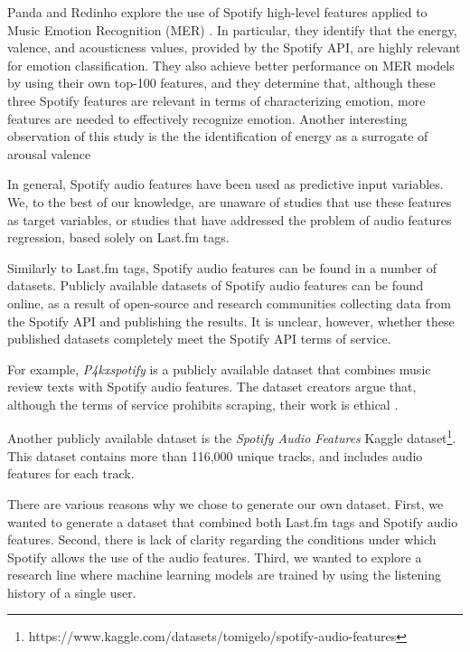 \documentclass[sn-mathphys]{sn-jnl}%
\theoremstyle{thmstyleone}%
\theoremstyle{thmstyletwo}%
\theoremstyle{thmstylethree}%
\begin{document}
Panda and Redinho explore the use of Spotify high-level features applied to Music Emotion Recognition (MER) \cite{panda2021does}.
In particular, they identify that the energy, valence, and acousticness values, provided by the Spotify API,
are highly relevant for emotion classification.
They also achieve better performance on MER models by using their own top-100 features, and they determine that,
although these three Spotify features are relevant in terms of characterizing emotion,
more features are needed to effectively recognize emotion.
Another interesting observation of this study is the the identification of energy as a surrogate of arousal valence


In general, Spotify audio features have been used as predictive input variables.
We, to the best of our knowledge, are unaware of studies that use these features as target variables,
or studies that have addressed the problem of audio features regression, based solely on Last.fm tags.


Similarly to Last.fm tags, Spotify audio features can be found in a number of datasets.
Publicly available datasets of Spotify audio features can be found online,
as a result of open-source and research communities collecting data from the Spotify API and publishing the results.
It is unclear, however, whether these published datasets completely meet the Spotify API terms of service.

For example, \emph{P4kxspotify} is a publicly available dataset that combines music review texts with Spotify audio features.
The dataset creators argue that, although the terms of service prohibits scraping, their work is ethical \cite{pinter2020p4kxspotify}.




Another publicly available dataset is the \emph{Spotify Audio Features} Kaggle dataset\footnote[4]{https://www.kaggle.com/datasets/tomigelo/spotify-audio-features}.
This dataset contains more than 116,000 unique tracks, and includes audio features for each track.

There are various reasons why we chose to generate our own dataset.
First, we wanted to generate a dataset that combined both Last.fm tags and Spotify audio features.
Second, there is lack of clarity regarding the conditions under which Spotify allows the use of the audio features.
Third, we wanted to explore a research line where machine learning models are trained by using the listening history of a single user.
\end{document}
